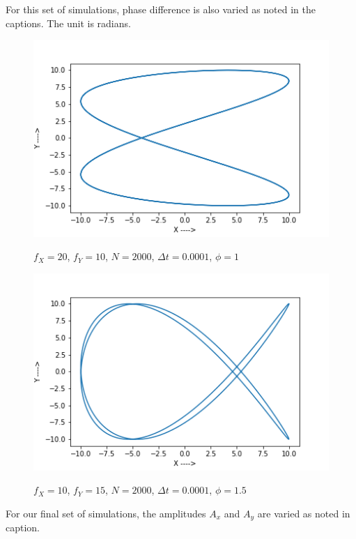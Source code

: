 \documentclass{report}
\begin{document}
For this set of simulations, phase difference is also varied as noted in the captions. The unit is radians.
\begin{figure}[H]
	\centering
	\includegraphics[width = \textwidth]{phase2010.png}
	\label{phase1}
	\caption{$f_X=20$, $f_Y=10$, $N=2000$, $\Delta t=0.0001$, $\phi=1$}
\end{figure}
\begin{figure}[H]
\centering
\includegraphics[width = \textwidth]{phase1015.png}
\label{phase2}
\caption{$f_X=10$, $f_Y=15$, $N=2000$, $\Delta t=0.0001$, $\phi=1.5$}
\end{figure}
\pagebreak

For our final set of simulations, the amplitudes $A_x$ and $A_y$ are varied as noted in caption.
\end{document}
